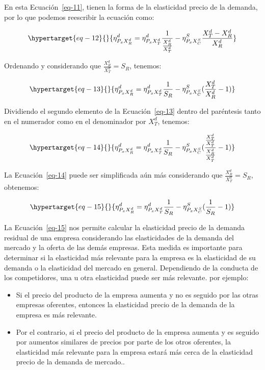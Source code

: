 \documentclass[
  letterpaper,
  DIV=11,
  numbers=noendperiod]{scrartcl}
\providecommand{\tightlist}{%
  \setlength{\itemsep}{0pt}\setlength{\parskip}{0pt}}\usepackage{longtable,booktabs,array}
\begin{document}
En esta Ecuación~\ref{eq-11}, tienen la forma de la elasticidad precio
de la demanda, por lo que podemos reescribir la ecuación como:

\begin{equation}\protect\hypertarget{eq-12}{}{
\eta_{P_{x}X_R^d}^d = \eta_{P_{x}X_T^d}^d \frac{1}{\frac{X_R^d}{X_T^d}} - \eta_{P_{x}X_C^S}^S \frac{X_T^d - X_R^d}{X_R^d}
}\label{eq-12}\end{equation}

Ordenando y considerando que \(\frac{X_R^d}{X_T^d} = S_R\), tenemos:

\begin{equation}\protect\hypertarget{eq-13}{}{
\eta_{P_{x}X_R^d}^d = \eta_{P_{x}X_T^d}^d \frac{1}{S_R} - \eta_{P_{x}X_C^S}^S (\frac{X_T^d}{X_R^d} - 1)
}\label{eq-13}\end{equation}

Dividiendo el segundo elemento de la Ecuación~\ref{eq-13} dentro del
paréntesis tanto en el numerador como en el denominador por \(X_T^d\),
tenemos:

\begin{equation}\protect\hypertarget{eq-14}{}{
\eta_{P_{x}X_R^d}^d = \eta_{P_{x}X_T^d}^d \frac{1}{S_R} - \eta_{P_{x}X_C^S}^S (\frac{\frac{X_T^d}{X_T^d}}{\frac{X_R^d}{X_T^d}} - 1)
}\label{eq-14}\end{equation}

La Ecuación~\ref{eq-14} puede ser simplificada aún más considerando que
\(\frac{X_R^d}{X_T^d} = S_R\), obtenemos:

\begin{equation}\protect\hypertarget{eq-15}{}{
\eta_{P_{x}X_R^d}^d = \eta_{P_{x}X_T^d}^d \frac{1}{S_R} - \eta_{P_{x}X_C^S}^S (\frac{1}{S_R} - 1)
}\label{eq-15}\end{equation}

La Ecuación~\ref{eq-15} nos permite calcular la elasticidad precio de la
demanda residual de una empresa considerando las elasticidades de la
demanda del mercado y la oferta de las demás empresas. Esta medida es
importante para determinar si la elasticidad más relevante para la
empresa es la elasticidad de su demanda o la elasticidad del mercado en
general. Dependiendo de la conducta de los competidores, una u otra
elasticidad puede ser más relevante. por ejemplo:

\begin{itemize}
\tightlist
\item
  Si el precio del producto de la empresa aumenta y no es seguido por
  las otras empresas oferentes, entonces la elasticidad precio de la
  demanda de la empresa es más relevante.
\item
  Por el contrario, si el precio del producto de la empresa aumenta y es
  seguido por aumentos similares de precios por parte de los otros
  oferentes, la elasticidad más relevante para la empresa estará más
  cerca de la elasticidad precio de la demanda de mercado..
\end{itemize}
\end{document}
